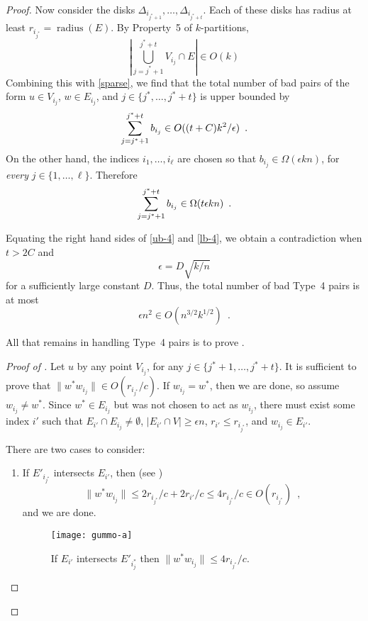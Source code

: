 \documentclass{patmorin}
\DeclareMathOperator{\radius}{radius}
\begin{document}
\begin{proof}
  Now consider the disks
  $\Delta_{i_{j^*+1}},\ldots,\Delta_{i_{j^*+t}}$. Each of these disks
  has radius at least $r_{i_{j^*}}=\radius(E)$.  By Property~5 of
  $k$-partitions,
  \[
    \left|\bigcup_{j=j^*+1}^{j^*+t} V_{i_{j}}\cap E\right|
      \in O(k)
  \]
  Combining this with \eqref{sparse}, we find that the total number
  of bad pairs of the form $u\in V_{i_{j}}$, $w\in E_{i_{j}}$,
  and $j\in\{j^*,\ldots,j^*+t\}$ is upper bounded by
  \begin{equation}
     \sum_{j=j^*+1}^{j^*+t} b_{i_{j}} 
        \in O((t+C)k^2/\epsilon) \enspace . \eqlabel{ub-4}
  \end{equation}
  On the other hand, the indices $i_1,\ldots,i_\ell$ are chosen
  so that $b_{i_j}\in\Omega(\epsilon kn)$, for \emph{every}
  $j\in\{1,\ldots,\ell\}$.  Therefore
  \begin{equation}
    \sum_{j=j^*+1}^{j^*+t} b_{i_{j}} 
        \in \Omega(t\epsilon kn) \enspace .
        \eqlabel{lb-4}
  \end{equation}
 
  Equating the right hand sides of \eqref{ub-4} and \eqref{lb-4}, we
  obtain a contradiction when $t>2C$ and
  \[
      \epsilon = D\sqrt{k/n}
  \] 
  for a sufficiently large constant $D$.
  Thus, the total number of bad Type~4 pairs is at most
  \[
    \epsilon n^2 \in O(n^{3/2}k^{1/2}) \enspace .
  \]

  All that remains in handling Type~4 pairs is to prove .

  \begin{proof}[Proof of ]
  Let $u$ by any point $V_{i_{j}}$, for any $j\in\{j^*+1,\ldots,j^*+t\}$.
  It is sufficient to prove that $\|w^*w_{i_{j}}\|\in O(r_{i_{j^*}}/c)$.
  If $w_{i_{j}}=w^*$, then we are done, so assume $w_{i_{j}}\neq
  w^*$.  Since $w^*\in E_{i_{j}}$ but was not chosen to act as
  $w_{i_{j}}$, there must exist some index $i'$ such that $E_{i'}\cap
  E_{i_{j}}\neq\emptyset$, $|E_{i'}\cap V|\ge\epsilon n$, $r_{i'}\le
  r_{i_{j^*}}$, and $w_{i_{j}}\in E_{i'}$.

  There are two cases to consider:
  \begin{enumerate}
    \item 
    If $E'_{i_{j^*}}$ intersects $E_{i'}$, then (see )
    \[
       \|w^*w_{i_j}\|\le 2r_{i_{j^*}}/c + 2r_{i'}/c \le 4r_{i_{j^*}}/c \in O(r_{i_{j^*}}) \enspace ,
    \]
    and we are done. 
    \begin{figure}
      \begin{center}
        \texttt{[image: gummo-a]}
        \caption{If $E_{i'}$ intersects $E'_{i_j^*}$ then $\|w^*w_{i_j}\|\le 4r_{i_{j^*}}/c$.}
      \end{center}
    \end{figure}
  

\end{enumerate}
\end{proof}
\end{proof}
\end{document}
